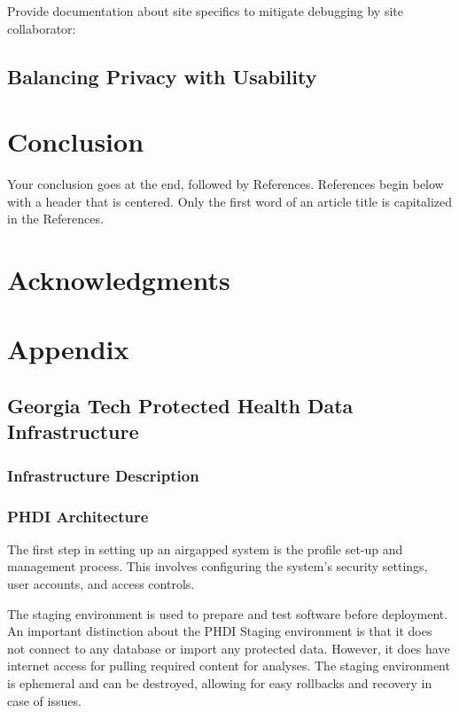 \documentclass{amia}
\begin{document}
Provide documentation about site specifics to mitigate debugging by site collaborator:



\subsection{Balancing Privacy with Usability}

\section*{Conclusion}

Your conclusion goes at the end, followed by References.  References begin below with a header that is centered.  Only the first word of an article title is capitalized in the References.

\section*{Acknowledgments}

\makeatletter
\renewcommand{\@biblabel}[1]{\hfill #1.}
\makeatother


  

\section*{Appendix}

\subsection{Georgia Tech Protected Health Data Infrastructure}

\subsubsection{Infrastructure Description}
\subsubsection*{PHDI Architecture}

The first step in setting up an airgapped system is the profile set-up and management process. This involves configuring the system's security settings, user accounts, and access controls.  

The staging environment is used to prepare and test software before deployment. An important distinction about the PHDI Staging environment is that it does not connect to any database or import any protected data. However, it does have internet access for pulling required content for analyses. The staging environment is ephemeral and can be destroyed, allowing for easy rollbacks and recovery in case of issues. 
\end{document}
